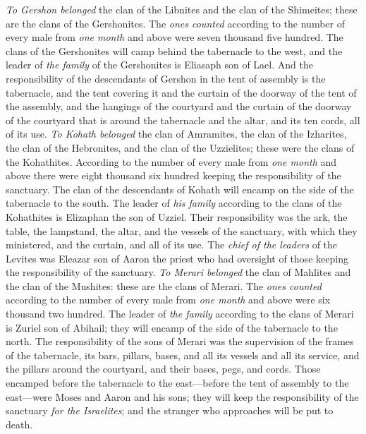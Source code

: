 \begin{biblechapter}
\verse \textit{To Gershon belonged} the clan of the Libnites and the clan of the Shimeites; these are the clans of the Gershonites.
\verse The \textit{ones counted} according to the number of every male from \textit{one month} and above were seven thousand five hundred.
\verse The clans of the Gershonites will camp behind the tabernacle to the west,
\verse and the leader of \textit{the family} of the Gershonites is Eliasaph son of Lael.
\verse And the responsibility of the descendants of Gershon in the tent of assembly is the tabernacle, and the tent covering it and the curtain of the doorway of the tent of the assembly,
\verse and the hangings of the courtyard and the curtain of the doorway of the courtyard that is around the tabernacle and the altar, and its ten cords, all of its use.
\verse \textit{To Kohath belonged} the clan of Amramites, the clan of the Izharites, the clan of the Hebronites, and the clan of the Uzzielites; these were the clans of the Kohathites.
\verse According to the number of every male from \textit{one month} and above there were eight thousand six hundred keeping the responsibility of the sanctuary.
\verse The clan of the descendants of Kohath will encamp on the side of the tabernacle to the south.
\verse The leader of \textit{his family} according to the clans of the Kohathites is Elizaphan the son of Uzziel.
\verse Their responsibility was the ark, the table, the lampstand, the altar, and the vessels of the sanctuary, with which they ministered, and the curtain, and all of its use.
\verse The \textit{chief of the leaders} of the Levites was Eleazar son of Aaron the priest who had oversight of those keeping the responsibility of the sanctuary.
\verse \textit{To Merari belonged} the clan of Mahlites and the clan of the Mushites: these are the clans of Merari.
\verse The \textit{ones counted} according to the number of every male from \textit{one month} and above were six thousand two hundred.
\verse The leader of \textit{the family} according to the clans of Merari is Zuriel son of Abihail; they will encamp of the side of the tabernacle to the north.
\verse The responsibility of the sons of Merari was the supervision of the frames of the tabernacle, its bars, pillars, bases, and all its vessels and all its service,
\verse and the pillars around the courtyard, and their bases, pegs, and cords.
\verse Those encamped before the tabernacle to the east—before the tent of assembly to the east—were Moses and Aaron and his sons; they will keep the responsibility of the sanctuary \textit{for the Israelites}; and the stranger who approaches will be put to death.

\end{biblechapter}
